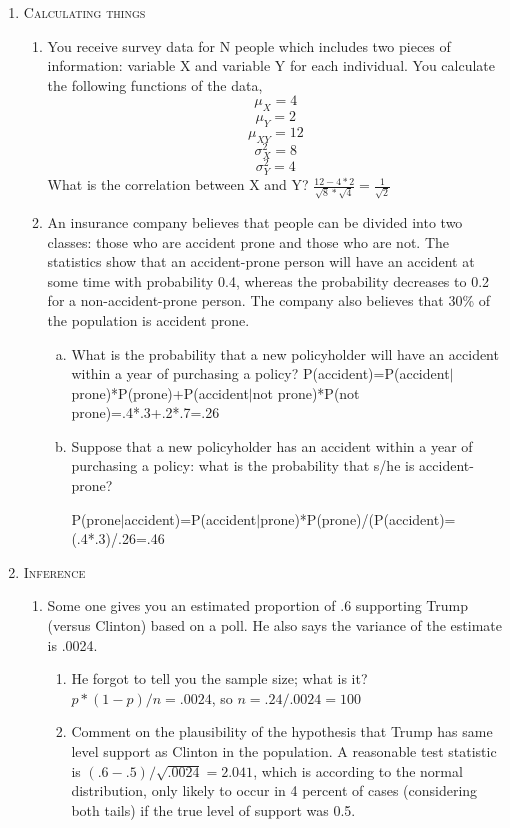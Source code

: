 \documentclass[11pt,letterpaper]{article}
\numberwithin{equation}{section}
\begin{document}
\begin{enumerate}[I]
\item \textsc{Calculating things}
\begin{enumerate}[1)]
\item You receive survey data for N people which includes two pieces of information: variable X and variable Y for each individual. You calculate the following functions of the data,
$$\mu_X=4$$
$$\mu_Y=2$$
$$\mu_{XY}=12$$
$$\sigma_X^2=8$$
$$\sigma_Y^2=4$$
What is the correlation between X and Y?  $\frac{12-4*2}{\sqrt{8}*\sqrt{4}}=\frac{1}{\sqrt{2}}$
\item An insurance company believes that people can be divided into two classes: those who are accident prone and those who are not. The statistics show that an accident-prone person will have an accident at some time with probability 0.4, whereas the probability decreases to 0.2 for a non-accident-prone person. The company also believes that 30\% of the population is accident prone.

\begin{enumerate}[a)]
\item What is the probability that a new policyholder will have an accident within a year of purchasing a policy?
P(accident)=P(accident$|$prone)*P(prone)+P(accident$|$not prone)*P(not prone)=.4*.3+.2*.7=.26
\item  Suppose that a new policyholder has an accident within a year of purchasing a policy: what is the probability that s/he is accident-prone?

P(prone$|$accident)=P(accident$|$prone)*P(prone)/(P(accident)= (.4*.3)/.26=.46

\end{enumerate}

\end{enumerate}
\item \textsc{Inference} 
\begin{enumerate}

\item Some one gives you an estimated proportion of $.6$ supporting Trump (versus Clinton) based on a poll. He also says the variance of the estimate is .0024.
\begin{enumerate}
\item[a)]  He forgot to tell you the sample size; what is it?  $p*(1-p)/n=.0024$, so $n=.24/.0024=100$
\item[b)] Comment on the plausibility of the hypothesis that Trump has same level support as Clinton in the population.  A reasonable test statistic is $(.6-.5)/\sqrt{.0024}=2.041$, which is according to the normal distribution, only likely to occur in 4 percent of cases (considering both tails) if the true level of support was 0.5.


\end{enumerate}
\end{enumerate}
\end{enumerate}
\end{document}
